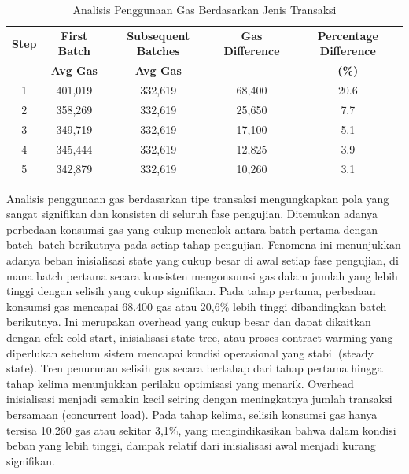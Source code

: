 \begin{table}[h!]
  \centering
  \begin{tabular}{|c|c|c|c|c|}
    \hline
    \textbf{Step} & \textbf{First Batch} & \textbf{Subsequent Batches} & \textbf{Gas Difference} & \textbf{Percentage Difference} \\
    \textbf{}     & \textbf{Avg Gas}     & \textbf{Avg Gas}            & \textbf{}               & \textbf{(\%)}                  \\
    \hline
    1             & 401,019              & 332,619                     & 68,400                  & 20.6                           \\
    \hline
    2             & 358,269              & 332,619                     & 25,650                  & 7.7                            \\
    \hline
    3             & 349,719              & 332,619                     & 17,100                  & 5.1                            \\
    \hline
    4             & 345,444              & 332,619                     & 12,825                  & 3.9                            \\
    \hline
    5             & 342,879              & 332,619                     & 10,260                  & 3.1                            \\
    \hline
  \end{tabular}
  \caption{Analisis Penggunaan Gas Berdasarkan Jenis Transaksi}
  \label{tab:gas_analysis}
\end{table}
Analisis penggunaan gas berdasarkan tipe transaksi mengungkapkan pola yang sangat signifikan dan konsisten di seluruh fase pengujian. Ditemukan adanya perbedaan konsumsi gas yang cukup mencolok antara batch pertama dengan batch–batch berikutnya pada setiap tahap pengujian. Fenomena ini menunjukkan adanya beban inisialisasi state yang cukup besar di awal setiap fase pengujian, di mana batch pertama secara konsisten mengonsumsi gas dalam jumlah yang lebih tinggi dengan selisih yang cukup signifikan. Pada tahap pertama, perbedaan konsumsi gas mencapai 68.400 gas atau 20,6\% lebih tinggi dibandingkan batch berikutnya. Ini merupakan overhead yang cukup besar dan dapat dikaitkan dengan efek cold start, inisialisasi state tree, atau proses contract warming yang diperlukan sebelum sistem mencapai kondisi operasional yang stabil (steady state). Tren penurunan selisih gas secara bertahap dari tahap pertama hingga tahap kelima menunjukkan perilaku optimisasi yang menarik. Overhead inisialisasi menjadi semakin kecil seiring dengan meningkatnya jumlah transaksi bersamaan (concurrent load). Pada tahap kelima, selisih konsumsi gas hanya tersisa 10.260 gas atau sekitar 3,1\%, yang mengindikasikan bahwa dalam kondisi beban yang lebih tinggi, dampak relatif dari inisialisasi awal menjadi kurang signifikan.

